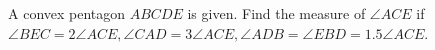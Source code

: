 A convex pentagon $ABCDE$ is given. Find the measure of $\angle ACE$ if $\angle BEC=2\angle ACE, 
\angle CAD = 3\angle ACE, \angle ADB=\angle EBD=1.5\angle ACE$.
